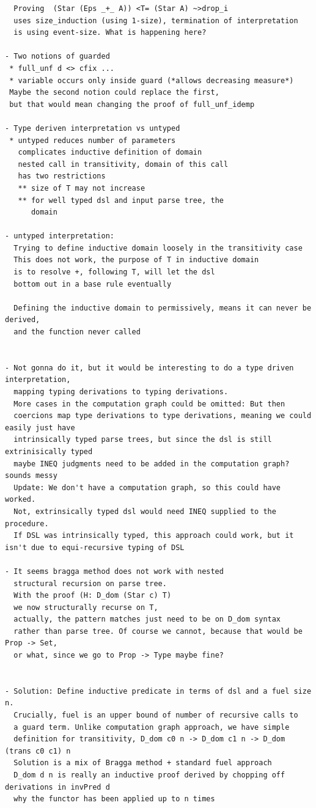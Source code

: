 \documentclass[a4paper,UKenglish,cleveref, autoref, thm-restate]{lipics-v2021}
\begin{document}
\begin{verbatim}
  Proving  (Star (Eps _+_ A)) <T= (Star A) ~>drop_i
  uses size_induction (using 1-size), termination of interpretation 
  is using event-size. What is happening here?

- Two notions of guarded
 * full_unf d <> cfix ...
 * variable occurs only inside guard (*allows decreasing measure*)
 Maybe the second notion could replace the first,
 but that would mean changing the proof of full_unf_idemp

- Type deriven interpretation vs untyped
 * untyped reduces number of parameters
   complicates inductive definition of domain
   nested call in transitivity, domain of this call
   has two restrictions
   ** size of T may not increase
   ** for well typed dsl and input parse tree, the
      domain 

- untyped interpretation:
  Trying to define inductive domain loosely in the transitivity case
  This does not work, the purpose of T in inductive domain
  is to resolve +, following T, will let the dsl
  bottom out in a base rule eventually
  
  Defining the inductive domain to permissively, means it can never be derived,
  and the function never called


- Not gonna do it, but it would be interesting to do a type driven interpretation,
  mapping typing derivations to typing derivations.
  More cases in the computation graph could be omitted: But then 
  coercions map type derivations to type derivations, meaning we could easily just have
  intrinsically typed parse trees, but since the dsl is still extrinisically typed 
  maybe INEQ judgments need to be added in the computation graph? sounds messy
  Update: We don't have a computation graph, so this could have worked.
  Not, extrinsically typed dsl would need INEQ supplied to the procedure.
  If DSL was intrinsically typed, this approach could work, but it isn't due to equi-recursive typing of DSL

- It seems bragga method does not work with nested 
  structural recursion on parse tree. 
  With the proof (H: D_dom (Star c) T) 
  we now structurally recurse on T,
  actually, the pattern matches just need to be on D_dom syntax
  rather than parse tree. Of course we cannot, because that would be Prop -> Set,
  or what, since we go to Prop -> Type maybe fine?

  
- Solution: Define inductive predicate in terms of dsl and a fuel size n.
  Crucially, fuel is an upper bound of number of recursive calls to 
  a guard term. Unlike computation graph approach, we have simple
  definition for transitivity, D_dom c0 n -> D_dom c1 n -> D_dom (trans c0 c1) n
  Solution is a mix of Bragga method + standard fuel approach
  D_dom d n is really an inductive proof derived by chopping off derivations in invPred d 
  why the functor has been applied up to n times
  


\end{verbatim}
\end{document}
